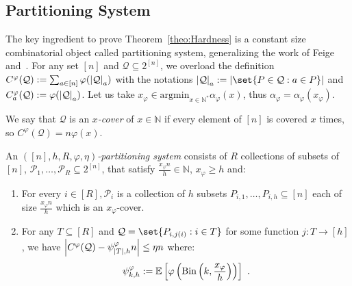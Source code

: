 \subsection{Partitioning System}

The key ingredient to prove Theorem~\ref{theo:Hardness} is a constant size combinatorial object called partitioning system, generalizing the work of Feige~\cite{Feige98} and~\cite{BFGG20}.
For any set $[n]$ and $\mathcal{Q} \subseteq 2^{[n]}$, we overload the definition $C^{\varphi}(\mathcal{Q}) := \sum_{a \in [n]} \varphi(\abs{\mathcal{Q}}_a)$ with the notations $\abs{\mathcal{Q}}_a:=\abs{\set{P \in \mathcal{Q} : a \in P}}$ and $C_a^{\varphi}(\mathcal{Q}) := \varphi(\abs{\mathcal{Q}}_a)$. Let us take $x_{\varphi} \in \text{argmin}_{x \in \mathbb{N}^*} \alpha_{\varphi}(x)$, thus $\alpha_{\varphi} = \alpha_{\varphi}(x_{\varphi})$.

We say that $\mathcal{Q}$ is an \emph{$x$-cover} of $x \in \mathbb{N}$ if every element of $[n]$ is covered $x$ times, so $C^{\varphi}(\mathcal{Q}) = n\varphi(x)$.

\begin{definition}
  An \emph{$([n],h,R,\varphi,\eta)$-partitioning system} consists of $R$ collections of subsets of $[n]$, $\mathcal{P}_1,\ldots,\mathcal{P}_R \subseteq 2^{[n]}$, that satisfy $\frac{x_{\varphi}n}{h} \in \mathbb{N}$, $x_{\varphi} \geq h$ and:
  \begin{enumerate}
  \item For every $i \in [R], \mathcal{P}_i$ is a collection of $h$ subsets $P_{i,1}, \ldots, P_{i,h} \subseteq [n]$ each of size $\frac{x_{\varphi}n}{h}$ which is an $x_{\varphi}$-cover.
  \item For any $T \subseteq [R]$ and $\mathcal{Q} = \set{P_{i,j(i)} : i \in T}$ for some function $j : T \rightarrow [h]$, we have $\abs{C^{\varphi}(\mathcal{Q}) -\psi^{\varphi}_{\abs{T},h} n} \leq \eta n$ where:
  \begin{align}
  \label{eq:def-phi}
   \psi^{\varphi}_{k,h} := \mathbb{E}\left[\varphi\left(\operatorname{\text{Bin}}\left(k,\frac{x_{\varphi}}{h}\right)\right)\right] \ .
   \end{align}
  \end{enumerate}
  \label{defi:PartSystem}
\end{definition}

